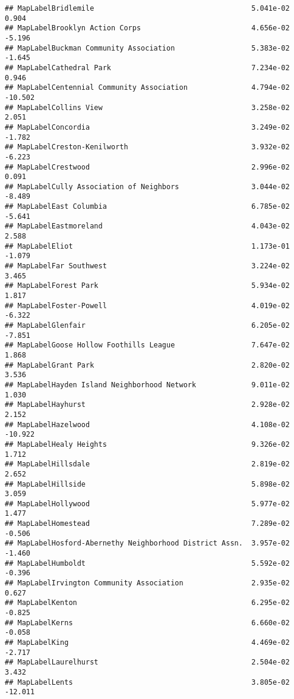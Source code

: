 \documentclass[]{article}
\begin{document}
\begin{verbatim}
## MapLabelBridlemile                                     5.041e-02   0.904
## MapLabelBrooklyn Action Corps                          4.656e-02  -5.196
## MapLabelBuckman Community Association                  5.383e-02  -1.645
## MapLabelCathedral Park                                 7.234e-02   0.946
## MapLabelCentennial Community Association               4.794e-02 -10.502
## MapLabelCollins View                                   3.258e-02   2.051
## MapLabelConcordia                                      3.249e-02  -1.782
## MapLabelCreston-Kenilworth                             3.932e-02  -6.223
## MapLabelCrestwood                                      2.996e-02   0.091
## MapLabelCully Association of Neighbors                 3.044e-02  -8.489
## MapLabelEast Columbia                                  6.785e-02  -5.641
## MapLabelEastmoreland                                   4.043e-02   2.588
## MapLabelEliot                                          1.173e-01  -1.079
## MapLabelFar Southwest                                  3.224e-02   3.465
## MapLabelForest Park                                    5.934e-02   1.817
## MapLabelFoster-Powell                                  4.019e-02  -6.322
## MapLabelGlenfair                                       6.205e-02  -7.851
## MapLabelGoose Hollow Foothills League                  7.647e-02   1.868
## MapLabelGrant Park                                     2.820e-02   3.536
## MapLabelHayden Island Neighborhood Network             9.011e-02   1.030
## MapLabelHayhurst                                       2.928e-02   2.152
## MapLabelHazelwood                                      4.108e-02 -10.922
## MapLabelHealy Heights                                  9.326e-02   1.712
## MapLabelHillsdale                                      2.819e-02   2.652
## MapLabelHillside                                       5.898e-02   3.059
## MapLabelHollywood                                      5.977e-02   1.477
## MapLabelHomestead                                      7.289e-02  -0.506
## MapLabelHosford-Abernethy Neighborhood District Assn.  3.957e-02  -1.460
## MapLabelHumboldt                                       5.592e-02  -0.396
## MapLabelIrvington Community Association                2.935e-02   0.627
## MapLabelKenton                                         6.295e-02  -0.825
## MapLabelKerns                                          6.660e-02  -0.058
## MapLabelKing                                           4.469e-02  -2.717
## MapLabelLaurelhurst                                    2.504e-02   3.432
## MapLabelLents                                          3.805e-02 -12.011

\end{verbatim}
\end{document}
